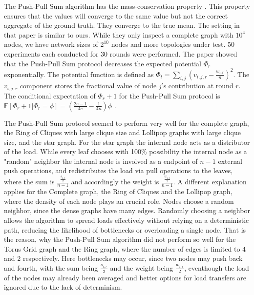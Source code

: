 

The Push-Pull Sum algorithm has the mass-conservation property \cite{nugroho2023PushPullSumDataAg}. This property ensures that the values will converge to the same value but not the correct aggregate of the ground truth. They converge to the true mean. The setting in that paper is similar to ours. While they only inspect a complete graph with $10^{4}$ nodes, we have network sizes of $2^{10}$ nodes and more topologies under test. 50 experiments each conducted for 30 rounds were performed. The paper showed that the Push-Pull Sum protocol decreases the expected potential $\Phi_r$ exponentially. The potential function is defined as $\Phi_t=\sum_{i,j}\left(v_{i,j,r}-\frac{w_{i,r}}{n}\right)^{2}$. The $v_{i,j,r}$ component stores the fractional value of node $j$'s contribution at round $r$. The conditional expectation of $\Phi_r+1$ for the Push-Pull Sum protocol is $\mathbb{E}[\Phi_r+1|\Phi_r=\phi]=(\frac{2e-1}{4e}-\frac{1}{4n})\phi$ \cite{nugroho2023PushPullSumDataAg}.

The Push-Pull Sum protocol seemed to perform very well for the complete graph, the Ring of Cliques with large clique size and Lollipop graphs with large clique size, and the star graph. For the star graph the internal node acts as a distributor of the load. While every leaf chooses with 100\% possibility the internal node as a "random" neighbor the internal node is involved as a endpoint of $n-1$ external push operations, and redistributes the load via pull operations to the leaves, where the sum is $\frac{\frac{s_{i,r}}{2}}{n-1}$ and accordingly the weight is $\frac{\frac{w_{i,r}}{2}}{n-1}$. A different explanation applies for the Complete graph, the Ring of Cliques and the Lollipop graph, where the density of each node plays an crucial role. Nodes choose a random neighbor, since the dense graphs have many edges. Randomly choosing a neighbor allows the algorithm to spread loads effectively without relying on a deterministic path, reducing the likelihood of bottlenecks or overloading a single node. That is the reason, why the Push-Pull Sum algorithm did not perform so well for the Torus Grid graph and the Ring graph, where the number of edges is limited to $4$ and $2$ respectively. Here bottlenecks may occur, since two nodes may push back and fourth, with the sum being $\frac{s_{i,r}}{2}$ and the weight being $\frac{w_{i,r}}{2}$, eventhough the load of the nodes may already been averaged and better options for load transfers are ignored due to the lack of determinism.
